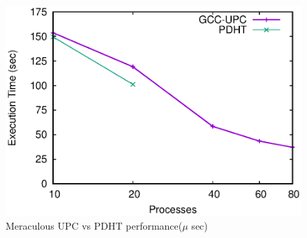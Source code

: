     

\begin{figure}
  \centering
  \includegraphics[width=.9\linewidth]{plots/meraculous}
  \caption{Meraculous UPC vs PDHT performance($\mu$ sec)}
  \label{fig:meraculous}
\end{figure}



